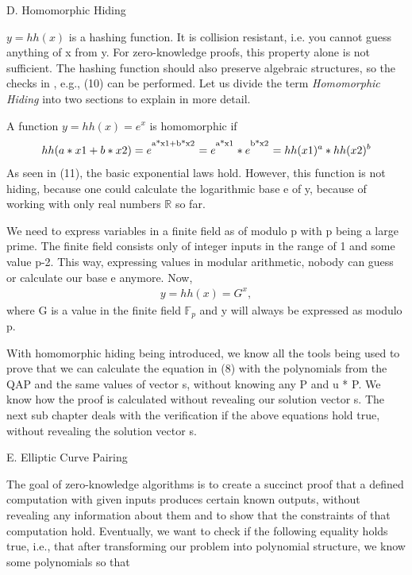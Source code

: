 D. Homomorphic Hiding

\(y = hh(x)\) is a hashing function. It is collision resistant, i.e. you cannot guess anything of x from y. For zero-knowledge proofs, this property alone is not sufficient. The hashing function should also preserve algebraic structures, so the checks in , e.g., (10) can be performed. Let us divide the term \textit{Homomorphic Hiding} into two sections to explain in more detail.

A function \(y = hh(x) = e^x\) is homomorphic if
\begin{align}
    hh(a*x1 + b*x2) = e^\textsuperscript{a*x1+b*x2} = e^\textsuperscript{a*x1} * e^\textsuperscript{b*x2} = hh(x1)^a * hh(x2)^b
\end{align}
As seen in (11), the basic exponential laws hold. However, this function is not hiding, because one could calculate the logarithmic base e of y, because of working with only real numbers \begin{math}\mathbb{R}  
\end{math} so far.


We need to express variables in a finite field as of modulo p with p being a large prime. The finite field consists only of integer inputs in the range of 1 and some value p-2. This way, expressing values in modular arithmetic, nobody can guess or calculate our base e anymore. Now,
\begin{align}
    y = hh(x) = G^x,
\end{align}
where G is a value in the finite field \begin{math}\mathbb{F}_p\end{math} and y will always be expressed as modulo p.

With homomorphic hiding being introduced, we know all the tools being used to prove that we can calculate the equation in (8) with the polynomials from the QAP and the same values of vector s, without knowing any P and u * P. We know how the proof is calculated without revealing our solution vector s. The next sub chapter deals with the verification if the above equations hold true, without revealing the solution vector s.

E. Elliptic Curve Pairing

The goal of zero-knowledge algorithms is to create a succinct proof that a defined computation with given inputs produces certain known outputs, without revealing any information about them and to show that the constraints of that computation hold. Eventually, we want to check if the following equality holds true, i.e., that after transforming our problem into polynomial structure, we know some polynomials so that

